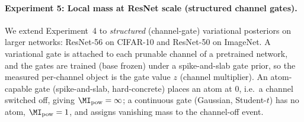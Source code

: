 
\paragraph{Experiment 5: Local mass at ResNet scale (structured channel gates).}
{\color{blue}
We extend Experiment~4 to \emph{structured} (channel-gate) variational posteriors on
larger networks: ResNet-56 on CIFAR-10 and ResNet-50 on ImageNet. A variational gate is
attached to each prunable channel of a pretrained network, and the gates are trained (base
frozen) under a spike-and-slab gate prior, so the measured per-channel object is the gate
value \(z\) (channel multiplier). An atom-capable gate (spike-and-slab, hard-concrete)
places an atom at \(0\), i.e.\ a channel switched off, giving \(\MI_{\mathrm{pow}}=\infty\);
a continuous gate (Gaussian, Student-\(t\)) has no atom, \(\MI_{\mathrm{pow}}=1\), and
assigns vanishing mass to the channel-off event.
}

